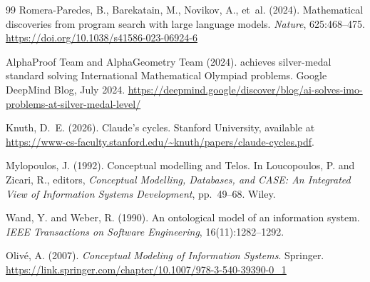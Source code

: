 \documentclass[runningheads]{llncs}
\begin{document}
\begin{thebibliography}{99}
Romera-Paredes, B., Barekatain, M., Novikov, A., et~al. (2024).
\newblock Mathematical discoveries from program search with large language models.
\newblock \emph{Nature}, 625:468--475.
\newblock \url{https://doi.org/10.1038/s41586-023-06924-6}

AlphaProof Team and AlphaGeometry Team (2024).
 achieves silver-medal standard solving {I}nternational {M}athematical {O}lympiad problems.
\newblock Google DeepMind Blog, July 2024.
\newblock \url{https://deepmind.google/discover/blog/ai-solves-imo-problems-at-silver-medal-level/}

Knuth, D.~E. (2026).
\newblock Claude's cycles.
\newblock Stanford University, available at \url{https://www-cs-faculty.stanford.edu/~knuth/papers/claude-cycles.pdf}.

Mylopoulos, J. (1992).
\newblock Conceptual modelling and {T}elos.
\newblock In Loucopoulos, P. and Zicari, R., editors, \emph{Conceptual Modelling, Databases, and CASE: An Integrated View of Information Systems Development}, pp.\ 49--68. Wiley.

Wand, Y. and Weber, R. (1990).
\newblock An ontological model of an information system.
\newblock \emph{IEEE Transactions on Software Engineering}, 16(11):1282--1292.

Oliv\'{e}, A. (2007).
\newblock \emph{Conceptual Modeling of Information Systems}.
\newblock Springer.
\newblock \url{https://link.springer.com/chapter/10.1007/978-3-540-39390-0_1}

\end{thebibliography}
\end{document}
